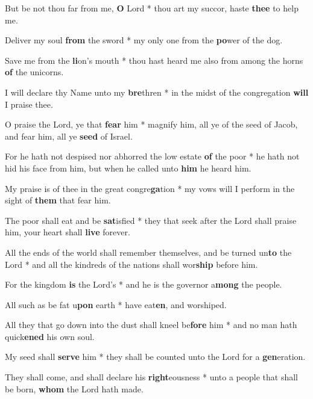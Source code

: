 \begin{multicols}{2}
	But be not thou far from me, \textbf{O} Lord * thou art my succor, haste \textbf{thee} to help me.
	
	Deliver my soul \textbf{from} the sword * my only one from the \textbf{po}wer of the dog.
	
	Save me from the \textbf{li}on's mouth * thou hast heard me also from among the horns \textbf{of} the unicorns.
	
	I will declare thy Name unto my \textbf{bre}thren * in the midst of the congregation \textbf{will} I praise thee.
	
	O praise the Lord, ye that \textbf{fear} him * magnify him, all ye of the seed of Jacob, and fear him, all ye \textbf{seed} of Israel.
	
	For he hath not despised nor abhorred the low estate \textbf{of} the poor * he hath not hid his face from him, but when he called unto \textbf{him} he heard him.
	
	My praise is of thee in the great congre\textbf{ga}tion * my vows will I perform in the sight of \textbf{them} that fear him.
	
	The poor shall eat and be \textbf{sat}isfied * they that seek after the Lord shall praise him, your heart shall \textbf{live} forever.
	
	All the ends of the world shall remember themselves, and be turned un\textbf{to} the Lord * and all the kindreds of the nations shall wor\textbf{ship} before him.
	
	For the kingdom \textbf{is} the Lord's * and he is the governor a\textbf{mong} the people.
	
	All such as be fat u\textbf{pon} earth * have eat\textbf{en}, and worshiped.
	
	All they that go down into the dust shall kneel be\textbf{fore} him * and no man hath quick\textbf{ened} his own soul.
	
	My seed shall \textbf{serve} him * they shall be counted unto the Lord for a \textbf{gen}eration.
	
	They shall come, and shall declare his \textbf{right}eousness * unto a people that shall be born, \textbf{whom} the Lord hath made.
\end{multicols}